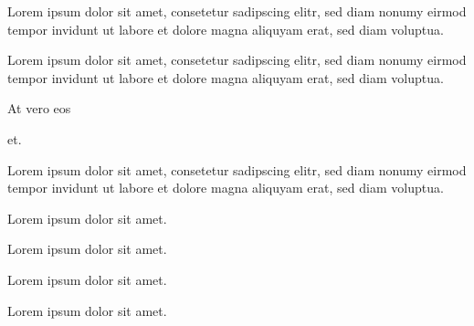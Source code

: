 


Lorem ipsum dolor sit amet, consetetur sadipscing elitr, sed
diam nonumy eirmod tempor invidunt ut labore et dolore magna aliquyam
erat, sed diam voluptua.
\tEndVerbatim

\clozeparcapture Lorem ipsum dolor sit amet, consetetur sadipscing
elitr, sed diam nonumy eirmod tempor invidunt ut labore et dolore magna
aliquyam erat, sed diam voluptua. \par
\tEndVerbatim

At vero \clozeparcapture eos \par et.
\tEndVerbatim

Lorem ipsum dolor sit amet, consetetur sadipscing elitr, sed
diam nonumy eirmod tempor invidunt ut labore et dolore magna aliquyam
erat, sed diam voluptua.
\tEndVerbatim

\clozeparcapture Lorem ipsum dolor sit amet.
\par
\tEndVerbatim

\clozeparcapture Lorem ipsum dolor sit amet.
\par
\tEndVerbatim

\clozeparcapture Lorem ipsum dolor sit amet.
\par
\tEndVerbatim

\clozeparcapture Lorem ipsum dolor sit amet.
\par
\tEndVerbatim

\tAll

\bye
